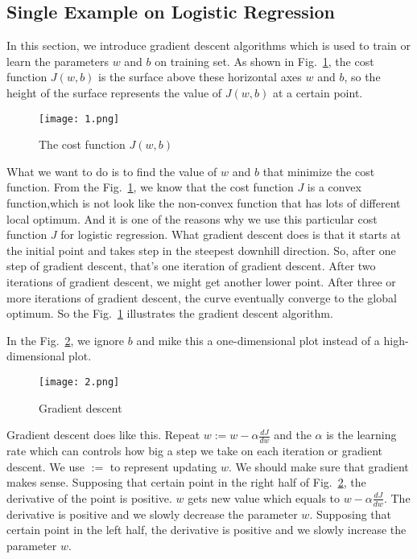 \documentclass[a4paper]{article}
\begin{document}
\subsection{Single Example on Logistic Regression}
In this section, we introduce gradient descent algorithms which
is used to train or learn the parameters $w$ and $b$ on training set.
As shown in Fig.~\ref{fig1}, the cost function $J\left(w,b\right)$ is
the surface above these horizontal axes $w$ and $b$, so the height
of the surface represents the value of $J\left(w,b\right)$ at a
certain point.
%
\begin{figure}[htbp]
	\centering
	\texttt{[image: 1.png]}
	\caption{The cost function $J\left(w,b\right)$}
	\label{fig1}
\end{figure}
%
What we want to do is to find the value of $w$ and
$b$ that minimize the cost function. From the Fig.~\ref{fig1}, we 
know that the cost function $J$ is a convex function,which is not look 
like the non-convex function that has lots of different local optimum.
And it is one of the reasons why we use this particular cost function $J$ for logistic
regression. What gradient descent does is that it starts at the initial point and 
takes step in the steepest downhill direction. So, after one step of
gradient descent, that's one iteration of gradient descent. After two
iterations of gradient descent, we might get another lower point. After
three or more iterations of gradient descent, the curve eventually 
converge to the global optimum. So the Fig.~\ref{fig1} illustrates the gradient descent 
algorithm.
\par
In the Fig.~\ref{fig2}, we ignore $b$ and mike this a 
one-dimensional plot instead of a high-dimensional plot.
%
\begin{figure}[htbp]
	\centering
	\texttt{[image: 2.png]}
	\caption{Gradient descent}
	\label{fig2}
\end{figure}
%
Gradient descent does like this. Repeat $w:= w-\alpha \frac{dJ}{dw}$ and the $\alpha$
is the learning rate which can controls how big a step we take on each iteration 
or gradient descent. We use $:=$ to represent updating $w$. We should make sure 
that gradient makes sense. Supposing that certain point in the right half of 
Fig.~\ref{fig2}, the derivative of the point is positive. $w$ gets
new value which equals to $w - \alpha\frac{dJ}{dw}$. The derivative 
is positive and we slowly decrease the parameter $w$. Supposing that
certain point in the left half, the derivative is positive and we 
slowly increase the parameter $w$.
\par
\end{document}
